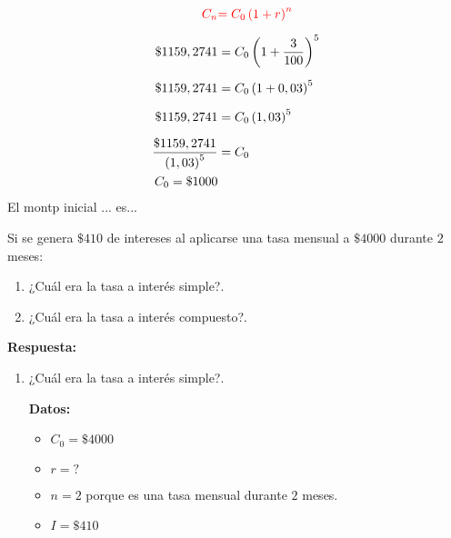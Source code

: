 \documentclass[12pt]{examdesign}
\theoremstyle{plain}
\theoremstyle{definition}
\theoremstyle{remark}
\begin{document}
\begin{shortanswer}[title={Leemos el material de consulta y realizamos las actividades propuestas.}, rearrange=no]
\begin{question}
\begin{answer}
\begin{enumerate}
        			    \begin{align*}
        			                           \textcolor{red}{ C_{n}} &\textcolor{red}{= C_{0}\left( 1+r\right)^{n}}
        			        \\[0.2cm]
        			        \$1159,2741                                &=C_{0}\left( 1+\frac{3}{100}\right)^{5}
        			        \\[0.2cm]  
        			        \$1159,2741                                &=C_{0}\left( 1+0,03\right)^{5}
        			        \\[0.2cm]
        			        \$1159,2741                                &=C_{0}\left( 1,03\right)^{5}
        			        \\[0.2cm]
        			        \frac{\$1159,2741}{\left( 1,03\right)^{5}} &=C_{0}\\
        			        C_{0}=\$1000
        			    \end{align*}
        		El montp inicial ... es...
        		\end{enumerate}
        	\end{answer}
        \end{question}
        
        \begin{question}
        	Si se genera $\$410$ de intereses al aplicarse una tasa mensual a $\$4000$ durante $2$ meses:	
        	\begin{enumerate}
        		\item ¿Cuál era la tasa a interés simple?.
        		\item ¿Cuál era la tasa a interés compuesto?.
        	\end{enumerate}
        	\begin{answer}
        		\textbf{Respuesta:}
        		\begin{enumerate}
        			\item  ¿Cuál era la tasa a interés simple?.
        			
        			\textbf{Datos:}
        			\begin{itemize}
        				\item $C_{0}=\$4000$
        				\item $r=?$
        				\item $n=2$ porque es una tasa mensual durante $2$ meses.
        				\item $I=\$410$
        			\end{itemize}
        			

\end{enumerate}
\end{answer}
\end{question}
\end{shortanswer}
\end{document}
